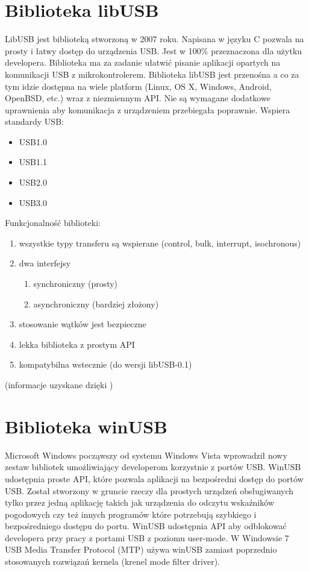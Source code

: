 \documentclass{BscUS}
\begin{document}
\section{Biblioteka libUSB}
LibUSB jest biblioteką stworzoną w 2007 roku. Napisana w języku C  pozwala na prosty i łatwy dostęp do urządzenia USB. Jest w 100\% przeznaczona dla użytku developera. Biblioteka ma za zadanie ułatwić pisanie aplikacji opartych na komunikacji USB z mikrokontrolerem.
Biblioteka libUSB jest przenośna a co za tym idzie dostępna na wiele platform (Linux, OS X, Windows, Android, OpenBSD, etc.) wraz z niezmiennym API.
Nie są wymagane dodatkowe uprawnienia aby komunikacja z urządzeniem przebiegała poprawnie.
Wspiera standardy USB: 
\begin{itemize}
\item USB1.0 
\item USB1.1 
\item USB2.0 
\item USB3.0
\end{itemize}
Funkcjonalność biblioteki:
\begin{enumerate}
\item wszystkie typy transferu są wspierane (control, bulk, interrupt, isochronous)
\item dwa interfejsy
\begin{enumerate}
\item synchroniczny (prosty)
\item asynchroniczny (bardziej złożony)
\end{enumerate}
\item stosowanie wątków jest bezpieczne
\item lekka biblioteka z prostym API
\item kompatybilna wstecznie (do wersji libUSB-0.1)
\end{enumerate}
(informacje uzyskane dzięki \cite{libusbDesc})
\section{Biblioteka winUSB}
Microsoft Windows począwszy od systemu Windows Vista wprowadził nowy zestaw bibliotek umożliwiający developerom korzystnie z portów USB. WinUSB udostępnia proste API, które pozwala aplikacji na bezpośredni dostęp do portów USB. Został stworzony w gruncie rzeczy dla prostych urządzeń obsługiwanych tylko przez jedną aplikację takich jak urządzenia do odczytu wskaźników pogodowych czy też innych programów które potrzebują szybkiego i bezpośredniego dostępu do portu. WinUSB udostępnia API aby odblokować developera przy pracy z portami USB z poziomu user-mode. W Windowsie 7 USB Media Transfer Protocol (MTP) używa winUSB zamiast poprzednio stosowanych rozwiązań kernela (krenel mode filter driver).
\end{document}

